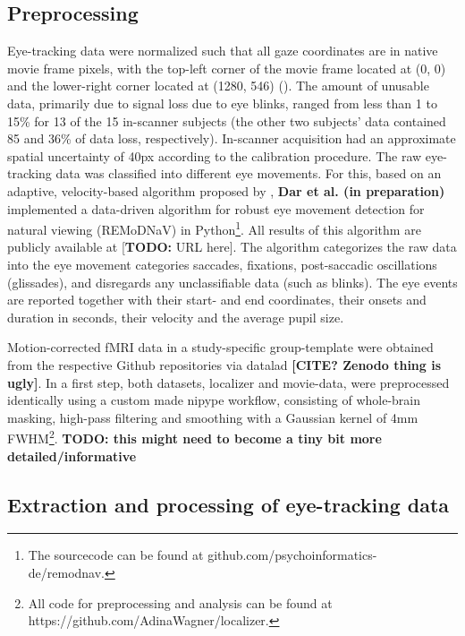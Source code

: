 \documentclass[a4paper, 12pt]{scrreprt}
\begin{document}
{\subsection{Preprocessing}
Eye-tracking data were normalized such that all gaze coordinates are in native movie frame pixels, with the top-left corner of the movie frame located at (0, 0) and the lower-right corner located at (1280, 546) (\cite{hanke2016studyforrest}). The amount of unusable data, primarily due to signal loss due to eye blinks, ranged from less than 1 to 15\% for 13 of the 15 in-scanner subjects (the other two subjects’ data contained 85 and 36\% of data loss, respectively). In-scanner acquisition had an approximate spatial uncertainty of 40px according to the calibration procedure. \newline
The raw eye-tracking data was classified into different eye movements. For this, based on an adaptive, velocity-based algorithm proposed by \textcite{nystrom2010adaptive}, \textbf{Dar et al. (in preparation)} implemented a data-driven algorithm for robust eye movement detection for natural viewing (REMoDNaV) in Python\footnote{The sourcecode can be found at github.com/psychoinformatics-de/remodnav.}. All results of this algorithm are publicly available at [\textbf{TODO: }URL here]. The algorithm categorizes the raw data into the eye movement categories saccades, fixations, post-saccadic oscillations (glissades), and disregards any unclassifiable data (such as blinks). The eye events are reported together with their start- and end coordinates, their onsets and duration in seconds, their velocity and the average pupil size.

Motion-corrected fMRI data in a study-specific group-template were obtained from the respective Github repositories via datalad \textbf{[CITE? Zenodo thing is ugly]}. In a first step, both datasets, localizer and movie-data, were preprocessed identically using a custom made nipype workflow, consisting of whole-brain masking, high-pass filtering and smoothing with a Gaussian kernel of 4mm FWHM\footnote{All code for preprocessing and analysis can be found at https://github.com/AdinaWagner/localizer.}. \newline \textbf{TODO: this might need to become a tiny bit more detailed/informative}

\subsection{Extraction and processing of eye-tracking data}

}
\end{document}
